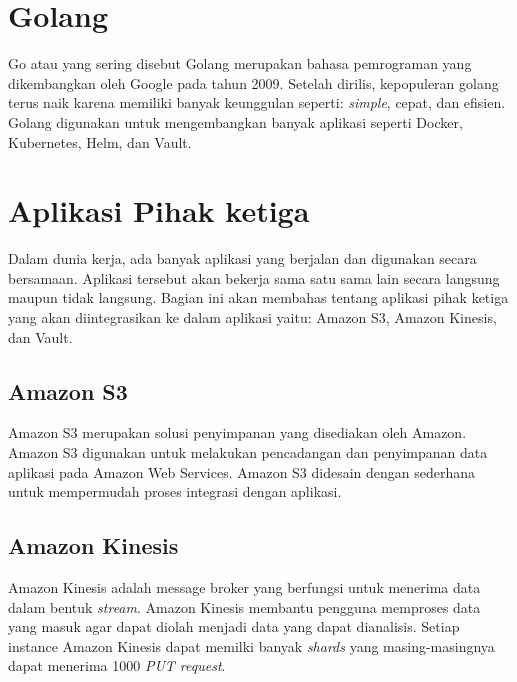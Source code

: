 \section{Golang}
\label{sec:golang}
Go atau yang sering disebut Golang merupakan bahasa pemrograman yang dikembangkan oleh Google pada tahun 2009\citep{chris_2021}. Setelah dirilis, kepopuleran golang terus naik karena memiliki banyak keunggulan seperti: \textit{simple}, cepat, dan efisien. Golang digunakan untuk mengembangkan banyak aplikasi seperti Docker, Kubernetes, Helm, dan Vault.
\section{Aplikasi Pihak ketiga}
\label{sec:aplikasiPihakKetiga}

Dalam dunia kerja, ada banyak aplikasi yang berjalan dan digunakan secara bersamaan. Aplikasi tersebut akan bekerja sama satu sama lain secara langsung maupun tidak langsung. Bagian ini akan membahas tentang aplikasi pihak ketiga yang akan diintegrasikan ke dalam aplikasi yaitu: Amazon S3, Amazon Kinesis, dan Vault.
\subsection{Amazon S3}
\label{sec:amazonS3}

Amazon S3 merupakan solusi penyimpanan yang disediakan oleh Amazon\citep{chai_2021}. Amazon S3 digunakan untuk melakukan pencadangan dan penyimpanan data aplikasi pada Amazon Web Services. Amazon S3 didesain dengan sederhana untuk mempermudah proses integrasi dengan aplikasi.

\subsection{Amazon Kinesis}
\label{sec:amazonKinesis}

Amazon Kinesis adalah message broker yang berfungsi untuk menerima data dalam bentuk \textit{stream}\citep{butts_2021}. Amazon Kinesis membantu pengguna memproses data yang masuk agar dapat diolah menjadi data yang dapat dianalisis. Setiap instance Amazon Kinesis dapat memilki banyak \textit{shards} yang masing-masingnya dapat menerima 1000 \textit{PUT request}.
